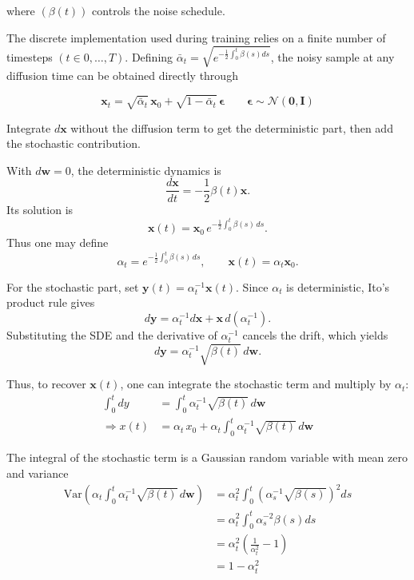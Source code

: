 \documentclass[11pt,a4paper]{article}
\begin{document}
where $(\beta(t))$ controls the noise schedule.

The discrete implementation used during training relies on a finite number of timesteps $(t\in{0,\ldots,T})$. Defining $\bar{\alpha}_t=\sqrt{e^{-\frac{1}{2}\int_0^t \beta(s) ds}}$, the noisy sample at any diffusion time can be obtained directly through

\begin{equation}
\mathbf{x}_t
=
\sqrt{\bar{\alpha}_t}\,\mathbf{x}_0
+
\sqrt{1-\bar{\alpha}_t}\,
\boldsymbol{\epsilon}
\qquad
\boldsymbol{\epsilon}
\sim
\mathcal{N}(\mathbf{0},\mathbf{I})
\label{eq:x_t}
\end{equation}

\begin{compactproof}[title={Proof}]
 Integrate $d\mathbf{x}$ without the diffusion term to get the
deterministic part, then add the stochastic contribution.

 With $d\mathbf{w}=0$, the deterministic dynamics is
\[
    \frac{d\mathbf{x}}{dt}
    =
    -\frac{1}{2}\beta(t)\mathbf{x}.
\]
Its solution is
\[
    \mathbf{x}(t)
    =
    \mathbf{x}_0
    \, e^{
        -\frac{1}{2}\int_0^t \beta(s)\,ds}.
\]
Thus one may define
\[
    \alpha_t
    = e^{
        -\frac{1}{2}\int_0^t \beta(s)\,ds},
    \qquad
    \mathbf{x}(t)=\alpha_t\mathbf{x}_0.
\]

 For the stochastic part, set
$\mathbf{y}(t)=\alpha_t^{-1}\mathbf{x}(t)$. Since $\alpha_t$ is deterministic,
Ito's product rule gives
\[
    d\mathbf{y}
    =
    \alpha_t^{-1}d\mathbf{x}
    +
    \mathbf{x}\,d(\alpha_t^{-1}).
\]
Substituting the SDE and the derivative of $\alpha_t^{-1}$ cancels the drift,
which yields
\[
    d\mathbf{y}
    =
    \alpha_t^{-1}\sqrt{\beta(t)}\,d\mathbf{w}.
\]

Thus, to recover $\mathbf{x}(t)$, one can integrate the stochastic term and multiply by $\alpha_t$:
\begin{align*}
    \int_{0}^{t} dy &= \int_{0}^{t} \alpha_t^{-1}\sqrt{\beta(t)}\,d\mathbf{w} \\
    \Rightarrow x(t) &= \alpha_t \, x_0 + \alpha_t \int_{0}^{t} \alpha_t^{-1}\sqrt{\beta(t)}\,d\mathbf{w}
\end{align*}

 The integral of the stochastic term is a Gaussian random variable with mean zero and variance
\begin{align*}
    \text{Var}\left(\alpha_t \int_{0}^{t} \alpha_t^{-1}\sqrt{\beta(t)}\,d\mathbf{w}\right)
    &= \alpha_t^2 \int_{0}^{t} (\alpha_s^{-1}\sqrt{\beta(s)})^2 ds \\
    &= \alpha_t^2 \int_{0}^{t} \alpha_s^{-2} \beta(s) ds \\
    &= \alpha_t^2 \left( \frac{1}{\alpha_t^2} -1 \right) \\
    &= 1 - \alpha_t^2
\end{align*}



\end{compactproof}
\end{document}
